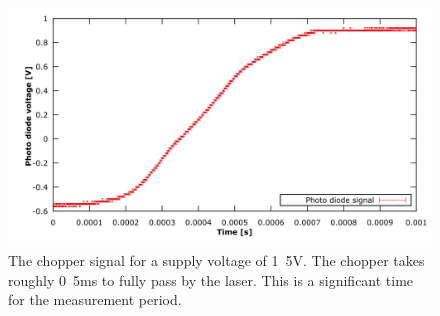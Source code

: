 \begin{figure}
\centering
\includegraphics[width=1.0\linewidth]{graphics/chopper1,5V}
\caption[Chopper signal 1.5V]{The chopper signal for a supply voltage of \unit{1.5}{V}. The chopper takes roughly \unit{0.5}{ms} to fully pass by the laser. This is a significant time for the measurement period.}
\label{fig:chopper1}
\end{figure}




